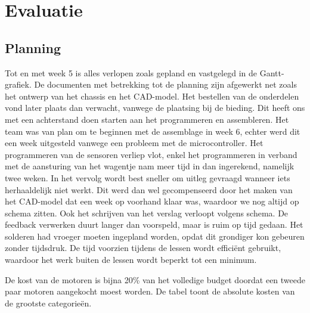 \documentclass[a4paper,kulak]{kulakarticle}
\begin{document}
	
\section{Evaluatie}

\subsection{Planning}
Tot en met week 5 is alles verlopen zoals gepland en vastgelegd in de Gantt-grafiek. De documenten met betrekking tot de planning zijn afgewerkt net zoals het ontwerp van het chassis en het CAD-model. Het bestellen van de onderdelen vond later plaats dan verwacht, vanwege de plaatsing bij de bieding. Dit heeft ons met een achterstand doen starten aan het programmeren en assembleren. Het team was van plan om te beginnen met de assemblage in week 6, echter werd dit een week uitgesteld vanwege een probleem met de microcontroller. Het programmeren van de sensoren verliep vlot, enkel het programmeren in verband met de aansturing van het wagentje nam meer tijd in dan ingerekend, namelijk twee weken. In het vervolg wordt best sneller om uitleg gevraagd wanneer iets herhaaldelijk niet werkt. Dit werd dan wel gecompenseerd door het maken van het CAD-model dat een week op voorhand klaar was, waardoor we nog altijd op schema zitten. Ook het schrijven van het verslag verloopt volgens schema. De feedback verwerken duurt langer dan voorspeld, maar is ruim op tijd gedaan. Het solderen had vroeger moeten ingepland worden, opdat dit grondiger kon gebeuren zonder tijdsdruk. De tijd voorzien tijdens de lessen wordt efficiënt gebruikt, waardoor het werk buiten de lessen wordt beperkt tot een minimum.

\begin{table}[h]
	
	\caption{De kost van de motoren is bijna 20\% van het volledige budget doordat een tweede paar motoren aangekocht moest worden. De tabel toont de absolute kosten van de grootste categorieën.}\label{fig:staafdiagram.credits}
\end{table}
\end{document}
